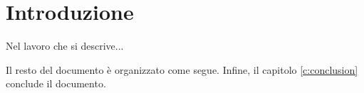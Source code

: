 \chapter{Introduzione}\label{c:introduction}

Nel lavoro che si descrive...

Il resto del documento è organizzato come segue.
Infine, il capitolo \ref{c:conclusion} conclude il documento.
